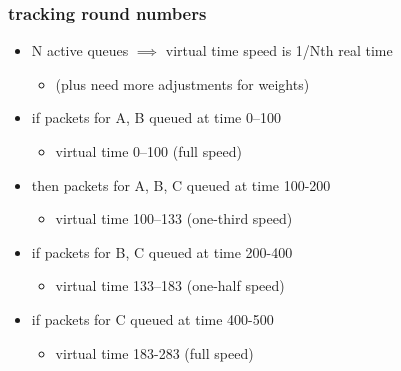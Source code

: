 \begin{frame}
\frametitle{tracking round numbers}
\begin{itemize}
\item N active queues $\implies$ virtual time speed is 1/Nth real time
    \begin{itemize}
    \item (plus need more adjustments for weights)
    \end{itemize}
\item if packets for A, B queued at time 0--100
    \begin{itemize}
    \item virtual time 0--100 (full speed)
    \end{itemize}
\item then packets for A, B, C queued at time 100-200
    \begin{itemize}
    \item virtual time 100--133 (one-third speed)
    \end{itemize}
\item if packets for B, C queued at time 200-400
    \begin{itemize}
    \item virtual time 133--183 (one-half speed)
    \end{itemize}
\item if packets for C queued at time 400-500
    \begin{itemize}
    \item virtual time 183-283 (full speed)
    \end{itemize}
\end{itemize}
\end{frame}


